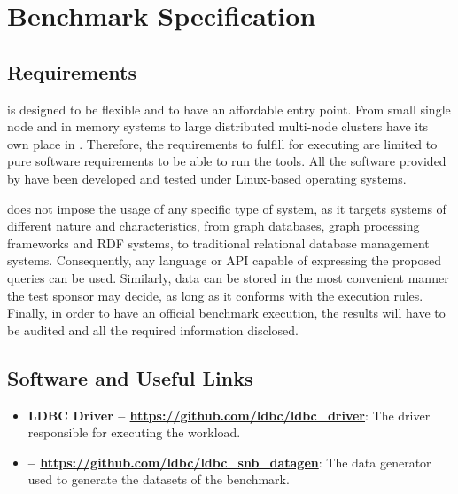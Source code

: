 \chapter{Benchmark Specification}
\label{sec:benchmark-specification}

\section{Requirements}

\ldbcsnb is designed to be flexible and to have an affordable entry point. From small single node and in memory systems to large distributed multi-node clusters have its own place in \ldbcsnb.  Therefore, the requirements to fulfill for executing \ldbcsnb are limited to pure software requirements to be able to run the tools. All the software provided by \ldbcsnb have been developed and tested under Linux-based operating systems.

\ldbcsnb does not impose the usage of any specific type of system, as it targets systems of different nature and characteristics, from graph databases, graph processing frameworks and RDF systems, to traditional relational database management systems. Consequently, any language or API capable of expressing the proposed queries can be used. Similarly, data can be stored in the most convenient manner the test sponsor may decide, as long as it conforms with the execution rules. Finally, in order to have an official benchmark execution, the results will have to be audited and all the required information disclosed.

\section{Software and Useful Links}

\begin{itemize}
    \item \textbf{LDBC Driver -- \url{https://github.com/ldbc/ldbc_driver}}: The driver
    responsible for executing the \ldbcsnb workload.
    \item \textbf{\datagen{} -- \url{https://github.com/ldbc/ldbc_snb_datagen}}: The data
    generator used to generate the datasets of the benchmark.
\end{itemize}
